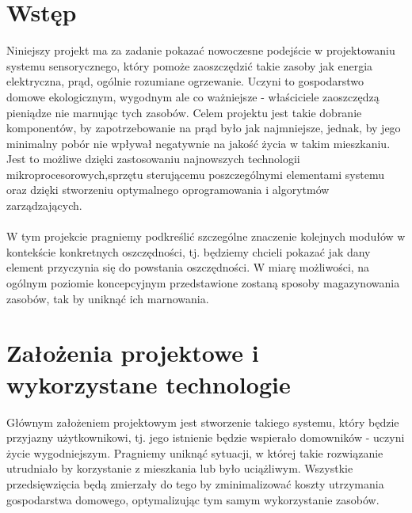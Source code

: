 \documentclass[12pt]{article} %
\begin{document}
\newpage %


\section{Wstęp} 

Niniejszy projekt ma za zadanie pokazać nowoczesne podejście w projektowaniu systemu sensorycznego, który pomoże zaoszczędzić takie zasoby jak energia elektryczna, prąd, ogólnie rozumiane ogrzewanie. Uczyni to gospodarstwo domowe ekologicznym, wygodnym ale co ważniejsze - właściciele zaoszczędzą pieniądze nie marnując tych zasobów. Celem projektu jest takie dobranie komponentów, by zapotrzebowanie na prąd było jak najmniejsze, jednak, by jego minimalny pobór nie wpływał negatywnie na jakość życia w takim mieszkaniu. Jest to możliwe dzięki zastosowaniu najnowszych technologii mikroprocesorowych,sprzętu sterującemu poszczególnymi elementami systemu oraz dzięki stworzeniu optymalnego oprogramowania i algorytmów zarządzających.
\\ \\
W tym projekcie pragniemy podkreślić szczególne znaczenie kolejnych modułów w kontekście konkretnych oszczędności, tj. będziemy chcieli pokazać jak dany element przyczynia się do powstania oszczędności. W miarę możliwości, na ogólnym poziomie koncepcyjnym przedstawione zostaną sposoby magazynowania zasobów, tak by uniknąć ich marnowania. 

\section{Założenia projektowe i wykorzystane technologie}
Głównym założeniem projektowym jest stworzenie takiego systemu, który będzie przyjazny użytkownikowi, tj. jego istnienie będzie wspierało domowników - uczyni życie wygodniejszym. Pragniemy uniknąć sytuacji, w której takie rozwiązanie utrudniało by korzystanie z mieszkania lub było uciążliwym. Wszystkie przedsięwzięcia będą zmierzały do tego by zminimalizować koszty utrzymania gospodarstwa domowego, optymalizując tym samym wykorzystanie zasobów.
\end{document}

